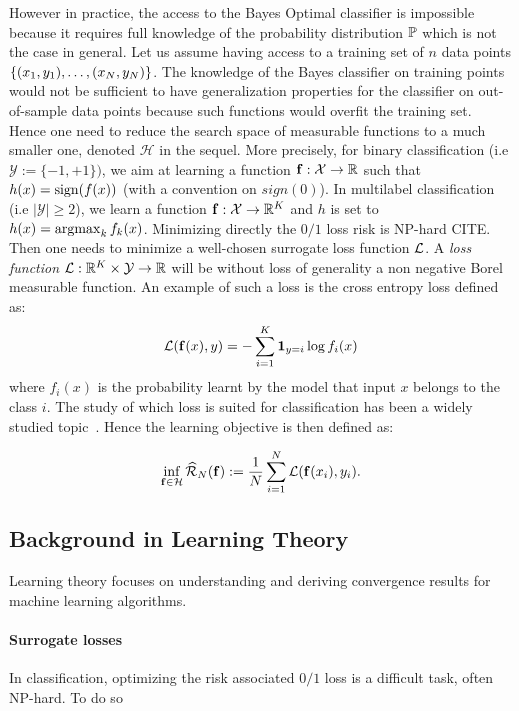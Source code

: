 However in practice, the access to the Bayes Optimal classifier is impossible because it requires full knowledge of the probability distribution $\mathbb{P}$ which is not the case in general. Let us assume having access to a training set of $n$ data points $\{(x_1,y_1),\dots,(x_N,y_N)\}$. The knowledge of the Bayes classifier on training points would not be sufficient to have generalization properties for the classifier on out-of-sample data points because such functions would overfit the training set. Hence one need to reduce the search space of measurable functions to a much smaller one, denoted $\mathcal{H}$ in the sequel. More precisely, for binary classification (i.e $\mathcal{Y}:=\{-1,+1\})$, we aim at learning a function $\mathbf{f}:\mathcal{X}\to\mathbb{R}$ such that $h(x)=\operatorname*{sign}(f(x))$ (with a convention on $sign(0)$). In multilabel classification (i.e $|\mathcal{Y}|\geq2$), we learn a function $\mathbf{f}:\mathcal{X}\to\mathbb{R}^K$ and $h$ is set to $h(x)=\operatorname*{argmax}_k f_k(x)$. Minimizing directly the $0/1$ loss risk is  NP-hard CITE. Then one needs to minimize a well-chosen surrogate loss function $\mathcal{L}$. A \textit{loss function} $\mathcal{L}:\mathbb{R}^K\times\mathcal{Y}\to\mathbb{R}$ will be without loss of generality a non negative Borel measurable function. An example of such a loss is the cross entropy loss defined as:
\begin{align*}
    \mathcal{L}(\mathbf{f}(x),y)=-\sum_{i=1}^K \mathbf{1}_{y=i}\log f_i(x)
\end{align*}
where $f_i(x)$ is the probability learnt by the model that input $x$ belongs to the class $i$. The study of which loss is suited for classification has been a widely studied topic~\citep{bartlett2006convexity,steinwart2007compare}. Hence the learning objective is then defined as:

\begin{align*}
\inf_{\mathbf{f}\in\mathcal{H}}\widehat{\mathcal{R}}_{N}(\mathbf{f}):= \frac{1}{N}\sum_{i=1}^N \mathcal{L}(\mathbf{f}(x_i),y_i).
\end{align*}

\subsection{Background in Learning Theory} 



Learning theory focuses on understanding and deriving convergence results for machine learning algorithms. %


\paragraph{Surrogate losses} In classification, optimizing the risk associated $0/1$ loss is a difficult task, often NP-hard. To do so 


